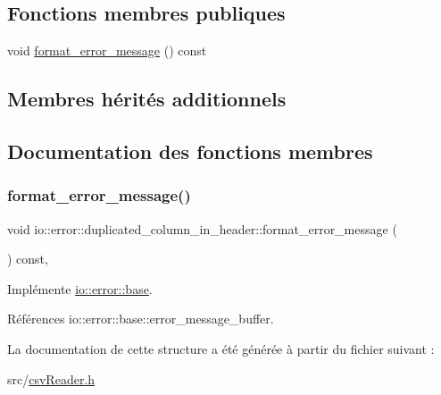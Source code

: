 \subsection*{Fonctions membres publiques}
\begin{DoxyCompactItemize}
\item 
void \hyperlink{structio_1_1error_1_1duplicated__column__in__header_a213825695d770d3ee2ee7bb9a2bfa818}{format\+\_\+error\+\_\+message} () const
\end{DoxyCompactItemize}
\subsection*{Membres hérités additionnels}


\subsection{Documentation des fonctions membres}
\mbox{\label{structio_1_1error_1_1duplicated__column__in__header_a213825695d770d3ee2ee7bb9a2bfa818}} 
\subsubsection{\texorpdfstring{format\+\_\+error\+\_\+message()}{format\_error\_message()}}
{\footnotesize\ttfamily void io\+::error\+::duplicated\+\_\+column\+\_\+in\+\_\+header\+::format\+\_\+error\+\_\+message (\begin{DoxyParamCaption}{ }\end{DoxyParamCaption}) const\hspace{0.3cm}{\ttfamily [inline]}, {\ttfamily [virtual]}}



Implémente \hyperlink{structio_1_1error_1_1base_a7d9ff6a31b716a24f056cf8a3e15191d}{io\+::error\+::base}.



Références io\+::error\+::base\+::error\+\_\+message\+\_\+buffer.



La documentation de cette structure a été générée à partir du fichier suivant \+:\begin{DoxyCompactItemize}
\item 
src/\hyperlink{csvReader_8h}{csv\+Reader.\+h}\end{DoxyCompactItemize}
